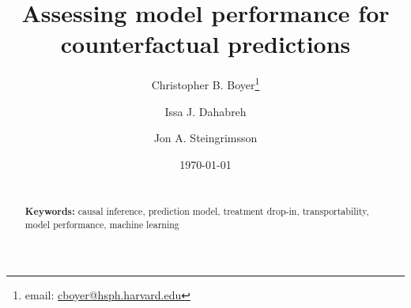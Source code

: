 \documentclass[12pt]{article}
\begin{document}
\begin{titlepage}
\title{Assessing model performance for counterfactual predictions} %
\author[1]{Christopher B. Boyer\thanks{email: \href{mailto:cboyer@hsph.harvard.edu}{cboyer@hsph.harvard.edu}}}
\author[1-3]{Issa J. Dahabreh}
\author[4]{Jon A. Steingrimsson}


\date{\today}
\maketitle

\begin{abstract}
\noindent 
\vspace{0in} \\
\noindent\textbf{Keywords:} causal inference, prediction model, treatment drop-in, transportability, model performance, machine learning \\

\bigskip
\end{abstract}
\setcounter{page}{0}
\thispagestyle{empty}
\end{titlepage}
\pagebreak \newpage

\doublespacing



\clearpage

\printbibliography

\clearpage

\begin{appendix}
    \renewcommand{\thefigure}{A\arabic{figure}}
    \setcounter{figure}{0}
    
    \renewcommand{\thetable}{A\arabic{table}}
    \setcounter{table}{0}
    
    \renewcommand{\theequation}{A\arabic{equation}}
    \setcounter{equation}{0}

    \renewcommand{\thesection}{\Alph{section}}

    \newpage

    
\end{appendix}

\onehalfspacing
\end{document}
